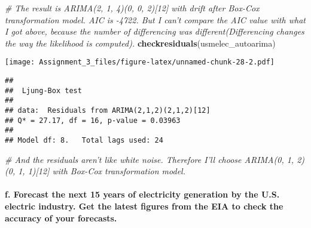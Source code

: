 \documentclass[]{article}
\newenvironment{Shaded}{\begin{snugshade}}{\end{snugshade}}
\newcommand{\KeywordTok}[1]{\textcolor[rgb]{0.13,0.29,0.53}{\textbf{#1}}}
\newcommand{\CommentTok}[1]{\textcolor[rgb]{0.56,0.35,0.01}{\textit{#1}}}
\newcommand{\NormalTok}[1]{#1}
\let\oldparagraph\paragraph
\renewcommand{\paragraph}[1]{\oldparagraph{#1}\mbox{}}
\begin{document}
\begin{Shaded}
\begin{Highlighting}[]
\CommentTok{# The result is ARIMA(2, 1, 4)(0, 0, 2)[12] with drift after Box-Cox transformation model. AIC is -4722. But I can't compare the AIC value with what I got above, because the number of differencing was different(Differencing changes the way the likelihood is computed).}
\KeywordTok{checkresiduals}\NormalTok{(usmelec_autoarima)}
\end{Highlighting}
\end{Shaded}

\texttt{[image: Assignment\_3\_files/figure-latex/unnamed-chunk-28-2.pdf]}

\begin{verbatim}
## 
##  Ljung-Box test
## 
## data:  Residuals from ARIMA(2,1,2)(2,1,2)[12]
## Q* = 27.17, df = 16, p-value = 0.03963
## 
## Model df: 8.   Total lags used: 24
\end{verbatim}

\begin{Shaded}
\begin{Highlighting}[]
\CommentTok{# And the residuals aren't like white noise. Therefore I'll choose ARIMA(0, 1, 2)(0, 1, 1)[12] with Box-Cox transformation model.}
\end{Highlighting}
\end{Shaded}

\paragraph{f. Forecast the next 15 years of electricity generation by
the U.S. electric industry. Get the latest figures from the EIA to check
the accuracy of your
forecasts.}\label{f.-forecast-the-next-15-years-of-electricity-generation-by-the-u.s.-electric-industry.-get-the-latest-figures-from-the-eia-to-check-the-accuracy-of-your-forecasts.}
\end{document}
